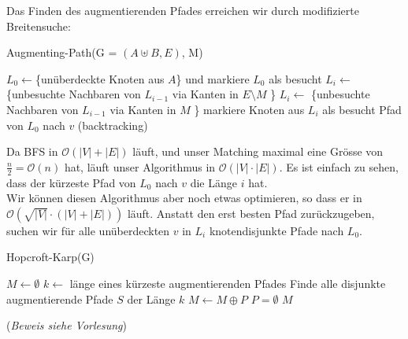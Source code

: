 \pagebreak
Das Finden des augmentierenden Pfades erreichen wir durch modifizierte Breitensuche:

\begin{algorithm}
    \caption{Augmenting-Path(G = $(A \uplus B, E)$, M)}
    \begin{algorithmic}[1]
        \State $L_0 \leftarrow $\{unüberdeckte Knoten aus $A$\} und markiere $L_0$ als besucht
                \State $L_i \leftarrow $ \{unbesuchte Nachbaren von $L_{i-1}$ via Kanten in $E \setminus M$ \}
            \Else 
                \State $L_i \leftarrow $ \{unbesuchte Nachbaren von $L_{i-1}$ via Kanten in $M$ \}
            \EndIf
            \State markiere Knoten aus $L_i$ als besucht
                \State \Return Pfad von $L_0$ nach $v$ (backtracking)
            \EndIf
        \EndFor
    \end{algorithmic}
\end{algorithm}

Da BFS in $\mathcal{O}(|V| + |E|)$ läuft, und unser Matching maximal eine Grösse von $\frac{n}{2} = \mathcal{O}(n)$
hat, läuft unser Algorithmus in $\mathcal{O}(|V| \cdot |E|)$. Es ist einfach zu sehen, dass der kürzeste Pfad von
$L_0$ nach $v$ die Länge $i$ hat. \\

Wir können diesen Algorithmus aber noch etwas optimieren, so dass er in $\mathcal{O}(\sqrt{|V|} \cdot (|V| + |E|))$ läuft. Anstatt den erst besten Pfad
zurückzugeben, suchen wir für alle unüberdeckten $v$ in $L_i$ knotendisjunkte Pfade nach $L_0$.

\begin{algorithm}
    \caption{Hopcroft-Karp(G)}
    \begin{algorithmic}[1]
        \State $M \leftarrow \emptyset$
        \Repeat
            \State $k \leftarrow$ länge eines kürzeste augmentierenden Pfades
            \State Finde alle disjunkte augmentierende Pfade $S$ der Länge $k$
                \State $M \leftarrow M \oplus P$
            \EndFor
        \Until $P = \emptyset$
        \State \Return $M$
    \end{algorithmic}
\end{algorithm}
(\textit{Beweis siehe Vorlesung})